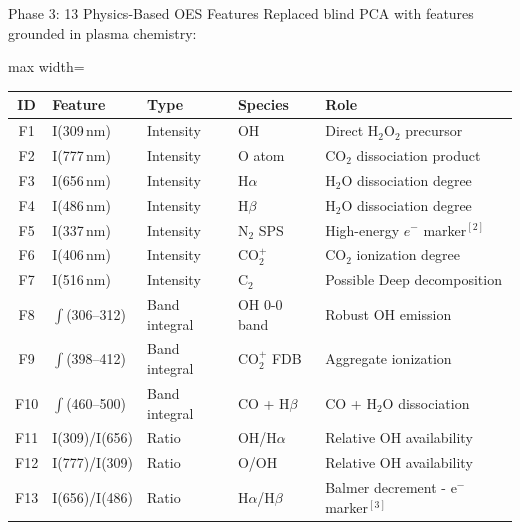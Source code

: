 \documentclass{libs/XJTLU_format}
\begin{document}
\begin{frame}{Phase 3: 13 Physics-Based OES Features}
    Replaced blind PCA with features grounded in plasma chemistry:
    \vspace{0.3em}
    \begin{adjustbox}{max width=\textwidth}
    \small
    \begin{tabular}{@{}cllll@{}}
        \toprule
        \textbf{ID} & \textbf{Feature} & \textbf{Type} & \textbf{Species} & \textbf{Role} \\
        \midrule
        F1  & I(309\,nm)        & Intensity & OH        & Direct H$_2$O$_2$ precursor \\
        F2  & I(777\,nm)        & Intensity & O atom    & CO$_2$ dissociation product \\
        F3  & I(656\,nm)        & Intensity & H$\alpha$ & H$_2$O dissociation degree \\
        F4  & I(486\,nm)        & Intensity & H$\beta$  & H$_2$O dissociation degree \\
        F5  & I(337\,nm)        & Intensity & N$_2$ SPS & High-energy $e^-$ marker$^{[2]}$ \\
        F6  & I(406\,nm)        & Intensity & CO$_2^+$  & CO$_2$ ionization degree \\
        F7  & I(516\,nm)        & Intensity & C$_2$     & Possible Deep decomposition \\
        \midrule
        F8  & $\int$(306--312)   & Band integral & OH 0-0 band    & Robust OH emission \\
        F9  & $\int$(398--412)   & Band integral & CO$_2^+$ FDB   & Aggregate ionization \\
        F10 & $\int$(460--500)   & Band integral & CO + H$\beta$  & CO + H$_2$O dissociation \\
        \midrule
        F11 & I(309)/I(656)     & Ratio & OH/H$\alpha$           & Relative OH availability \\
        F12 & I(777)/I(309)     & Ratio & O/OH                   & Relative OH availability \\
        F13 & I(656)/I(486)     & Ratio & H$\alpha$/H$\beta$     & Balmer decrement - e$^-$ marker$^{[3]}$ \\
        \bottomrule
    \end{tabular}
    \end{adjustbox}
\end{frame}
\end{document}
